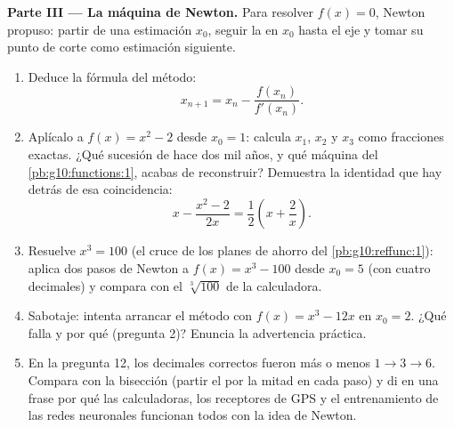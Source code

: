 \begin{problem}
\medskip
\noindent\textbf{Parte III --- La máquina de Newton.}
Para resolver $f(x) = 0$, Newton propuso: partir de una estimación $x_0$,
seguir la  en $x_0$ hasta el eje y tomar su punto de corte como
estimación siguiente.
\begin{enumerate}[resume]
  \item Deduce la fórmula del método:
        \[
        x_{n + 1} = x_n - \frac{f(x_n)}{f'(x_n)} .
        \]
  \item Aplícalo a $f(x) = x^2 - 2$ desde $x_0 = 1$: calcula $x_1$, $x_2$
        y $x_3$ como fracciones exactas. ¿Qué sucesión de hace dos mil
        años, y qué máquina del \cref{pb:g10:functions:1}, acabas de
        reconstruir? Demuestra la identidad que hay detrás de esa
        coincidencia:
        \[
        x - \frac{x^2 - 2}{2x} = \frac12\left(x + \frac2x\right).
        \]
  \item Resuelve $x^3 = 100$ (el cruce de los planes de ahorro del
        \cref{pb:g10:reffunc:1}): aplica dos pasos de Newton a
        $f(x) = x^3 - 100$ desde $x_0 = 5$ (con cuatro decimales) y
        compara con el $\sqrt[3]{100}$ de la calculadora.
  \item Sabotaje: intenta arrancar el método con $f(x) = x^3 - 12x$ en
        $x_0 = 2$. ¿Qué falla y por qué (pregunta 2)? Enuncia la
        advertencia práctica.
  \item En la pregunta 12, los decimales correctos fueron más o menos
        $1 \to 3 \to 6$. Compara con la bisección (partir el  por
        la mitad en cada paso) y di en una frase por qué las calculadoras,
        los receptores de GPS y el entrenamiento de las redes neuronales
        funcionan todos con la idea de Newton.
\end{enumerate}


\end{problem}
